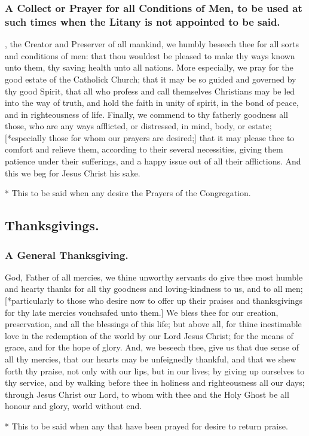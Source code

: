 \subsubsection{A Collect or Prayer for all Conditions of Men, to be used at such times when the Litany is not appointed to be said.}
, the Creator and Preserver of all mankind, we humbly beseech thee for all sorts and conditions of men: that thou wouldest be pleased to make thy ways known unto them, thy saving health unto all nations. More especially, we pray for the good estate of the Catholick Church; that it may be so guided and governed by thy good Spirit, that all who profess and call themselves Christians may be led into the way of truth, and hold the faith in unity of spirit, in the bond of peace, and in righteousness of life. Finally, we commend to thy fatherly goodness all those, who are any ways afflicted, or distressed, in mind, body, or estate; [*especially those for whom our prayers are desired;] that it may please thee to comfort and relieve them, according to their several necessities, giving them patience under their sufferings, and a happy issue out of all their afflictions. And this we beg for Jesus Christ his sake.
\begin{secrubric}
* This to be said when any desire the Prayers of the Congregation.
\end{secrubric}

\subsection{Thanksgivings.}

\subsubsection{A General Thanksgiving.}
 God, Father of all mercies, we thine unworthy servants do give thee most humble and hearty thanks for all thy goodness and loving-kindness to us, and to all men; [*particularly to those who desire now to offer up their praises and thanksgivings for thy late mercies vouchsafed unto them.] We bless thee for our creation, preservation, and all the blessings of this life; but above all, for thine inestimable love in the redemption of the world by our Lord Jesus Christ; for the means of grace, and for the hope of glory. And, we beseech thee, give us that due sense of all thy mercies, that our hearts may be unfeignedly thankful, and that we shew forth thy praise, not only with our lips, but in our lives; by giving up ourselves to thy service, and by walking before thee in holiness and righteousness all our days; through Jesus Christ our Lord, to whom with thee and the Holy Ghost be all honour and glory, world without end.
\begin{secrubric}
* This to be said when any that have been prayed for desire to return praise.
\end{secrubric}

